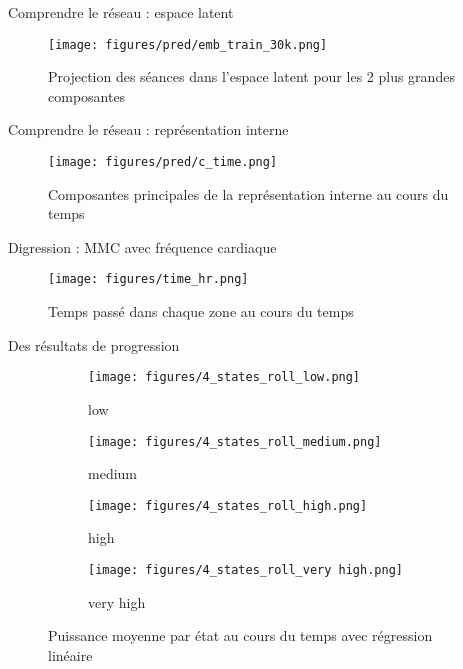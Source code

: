 \documentclass{beamer}
\begin{document}
\begin{frame}{Comprendre le réseau : espace latent}
    \begin{figure}
        \centering
        \texttt{[image: figures/pred/emb\_train\_30k.png]}
        \caption{Projection des séances dans l'espace latent pour les 2 plus grandes composantes}
    \end{figure}
\end{frame}
    
\begin{frame}{Comprendre le réseau : représentation interne}
    \begin{figure}
        \hspace*{-1.05cm}
        \texttt{[image: figures/pred/c\_time.png]}
        \caption{Composantes principales de la représentation interne au cours du temps}
    \end{figure}
\end{frame}

\begin{frame}{Digression : MMC avec fréquence cardiaque}
    \begin{figure}
        \centering
        \texttt{[image: figures/time\_hr.png]}
        \caption{Temps passé dans chaque zone au cours du temps}
        \end{figure}
\end{frame}
\begin{frame}{Des résultats de progression}
    \begin{figure}
        \centering
        \begin{subfigure}{0.45\textwidth}
            \centering
            \texttt{[image: figures/4\_states\_roll\_low.png]}
            \caption{low}
        \end{subfigure}
        \begin{subfigure}{0.45\textwidth}
            \centering
            \texttt{[image: figures/4\_states\_roll\_medium.png]}
            \caption{medium}
        \end{subfigure}
        \begin{subfigure}{0.45\textwidth}
            \centering
            \texttt{[image: figures/4\_states\_roll\_high.png]}
            \caption{high}
        \end{subfigure}
        \begin{subfigure}{0.45\textwidth}
            \centering
            \texttt{[image: figures/4\_states\_roll\_very high.png]}
            \caption{very high}
        \end{subfigure}
        \caption*{Puissance moyenne par état au cours du temps avec régression linéaire}
    \end{figure}
\end{frame}
\end{document}
